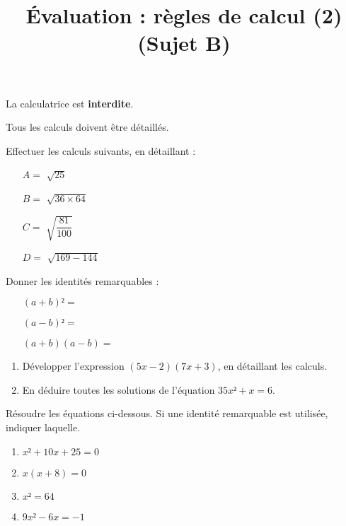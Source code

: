 \documentclass[
	classe=$2^{de}$,
	landscape,
	twocolumn
]{évaluation}
\begin{document}
\newpage
\setcounter{exercice}{1}

\title{Évaluation : règles de calcul (2) (Sujet B)}
\maketitle

\begin{tcolorbox}
	La calculatrice est \textbf{interdite}.

	Tous les calculs doivent être détaillés.
\end{tcolorbox}

\begin{exercice}[2]
	Effectuer les calculs suivants, en détaillant :
	\begin{enumerate}
		\item[$A =$] $\sqrt{25}$
		\item[$B =$] $\sqrt{36 × 64}$
		\item[$C =$] $\sqrt{\dfrac{81}{100}}$
		\item[$D =$] $\sqrt{169 - 144}$
	\end{enumerate}
\end{exercice}

\begin{exercice}[1,5]
	Donner les identités remarquables :
	\begin{enumerate}
		\item[\circled{1}] $(a + b)² = $
		\item[\circled{2}] $(a - b)² = $
		\item[\circled{3}] $(a + b)(a - b) = $
	\end{enumerate}
\end{exercice}

\begin{exercice}[2,5]
	\begin{enumerate}
		\item Développer l'expression $(5x - 2)(7x + 3)$, en détaillant les calculs.
		\item En déduire toutes les solutions de l'équation $35x² + x = 6$.
	\end{enumerate}
\end{exercice}

\begin{exercice}[4]
	Résoudre les équations ci-dessous. Si une identité remarquable est utilisée, indiquer laquelle.
	\begin{enumerate}
		\item $x² + 10x + 25 = 0$
		\item $x(x + 8) = 0$
		\item $x² = 64$
		\item $9x² - 6x = -1$
	\end{enumerate}
\end{exercice}
\end{document}
